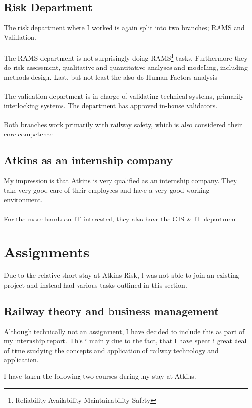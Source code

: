 \documentclass[11pt,a4paper,UKenglish]{article}
\begin{document}
\subsection{Risk Department}
The risk department where I worked is again split into two branches; RAMS and Validation.\\\\
The RAMS department is not surprisingly doing RAMS\footnote{Reliability Availability Maintainability Safety} tasks. Furthermore they do risk assessment, qualitative and quantitative analyses and modelling, including methods design. Last, but not least the also do Human Factors analysis\\\\
The validation department is in charge of validating technical systems, primarily interlocking systems. The department has approved in-house validators.\\\\
Both branches work primarily with railway safety, which is also considered their core competence.

\subsection{Atkins as an internship company}
My impression is that Atkins is very qualified as an internship company. They take very good care of their employees and have a very good working environment.\\\\
For the more hands-on IT interested, they also have the GIS  \& IT department.

\section{Assignments}
Due to the relative short stay at Atkins Risk, I was not able to join an existing project and instead had various tasks outlined in this section.

\subsection{Railway theory and business management}
Although technically not an assignment, I have decided to include this as part of my internship report. This i mainly due to the fact, that I have spent i great deal of time studying the concepts and application of railway technology and application.

I have taken the following two courses during my stay at Atkins.
\end{document}
